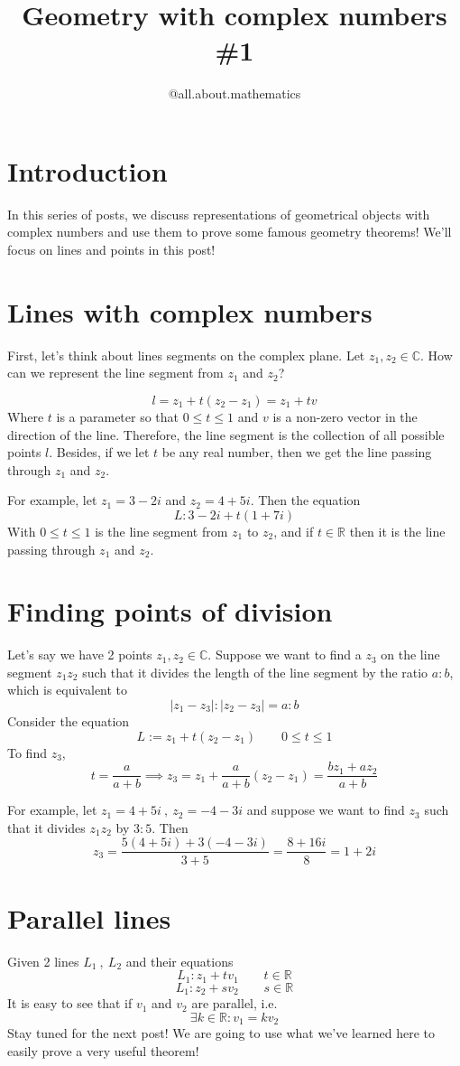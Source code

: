 \documentclass[10pt]{article}
\title{Geometry with complex numbers \#1}
\author{@all.about.mathematics}
\begin{document}
\maketitle
\pagecolor{black}
\LARGE
\section{Introduction}
In this series of posts, we discuss representations of geometrical objects with complex numbers and use them to prove some famous geometry theorems! We'll focus on lines and points in this post!

\newpage
\Large
\section{Lines with complex numbers}
First, let's think about lines segments on the complex plane. Let $z_1, z_2 \in\mathbb{C}$. How can we represent the line segment from $z_1$ and $z_2$? 

$$l=z_1+t(z_2-z_1)=z_1+tv$$
Where $t$ is a parameter so that $0\leq t\leq 1$ and $v$ is a non-zero vector in the direction of the line. Therefore, the line segment is the collection of all possible points $l$. Besides, if we let $t$ be any real number, then we get the line passing through $z_1$ and $z_2$.

\noindent
For example, let $z_1=3-2i$ and $z_2=4+5i$. Then the equation
$$L:3-2i+t(1+7i)$$
With $0\leq t\leq 1$ is the line segment from $z_1$ to $z_2$, and if $t\in\mathbb{R}$ then it is the line passing through $z_1$ and $z_2$. 

\newpage
\section{Finding points of division}
Let's say we have 2 points $z_1,z_2\in\mathbb{C}$. Suppose we want to find a $z_3$ on the line segment $z_1 z_2$ such that it divides the length of the line segment by the ratio $a:b$, which is equivalent to 
$$|z_1-z_3|:|z_2-z_3|=a:b$$
Consider the equation 
$$L:=z_1+t(z_2-z_1)\qquad 0\leq t \leq 1$$
To find $z_3$, 
$$t=\frac{a}{a+b}\implies z_3=z_1+\frac{a}{a+b}(z_2-z_1)=\frac{bz_1+az_2}{a+b}$$

\noindent
For example, let $z_1=4+5i\:,\: z_2=-4-3i$ and suppose we want to find $z_3$ such that it divides $z_1z_2$ by $3:5$. Then
$$z_3=\frac{5(4+5i)+3(-4-3i)}{3+5}=\frac{8+16i}{8}=1+2i$$

\newpage
\section{Parallel lines}
Given 2 lines $L_1\:,\: L_2$ and their equations 
$$L_1:z_1+tv_1 \qquad t\in\mathbb{R}$$
$$L_1:z_2+sv_2 \qquad s\in\mathbb{R}$$
It is easy to see that if $v_1$ and $v_2$ are parallel, i.e.
$$\exists k\in\mathbb{R}:v_1=kv_2 $$
Stay tuned for the next post! We are going to use what we've learned here to easily prove a very useful theorem!
\end{document}
